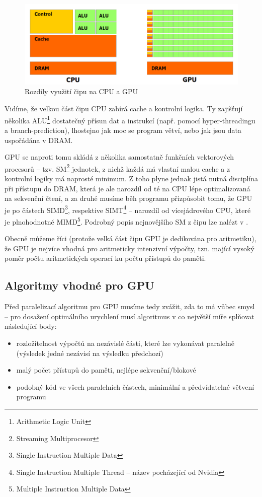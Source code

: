         \begin{figure}[h]\label{cpu vs gpu}
          \includegraphics[width = \textwidth]{src/2Gpu/CPUGPU.png}
          \caption{Rozdíly využití čipu na CPU a GPU}
        \end{figure}

        Vidíme, že velkou část čipu CPU zabírá cache a kontrolní logika. Ty zajišťují několika ALU\footnote{Arithmetic Logic Unit} dostatečný přísun dat a instrukcí (např. pomocí hyper-threadingu a branch-prediction), lhostejno jak moc se program větví, nebo jak jsou data uspořádána v DRAM.

        GPU se naproti tomu skládá z několika samostatně funkčních vektorových procesorů -- tzv. SM\footnote{Streaming Multiprocesor} jednotek, z nichž každá má vlastní malou cache a z kontrolní logiky má naprosté minimum. Z toho plyne jednak jistá nutná disciplína při přístupu do DRAM, která je ale narozdíl od té na CPU lépe optimalizovaná na sekvenční čtení, a za druhé musíme běh programu přizpůsobit tomu, že GPU je po částech SIMD\footnote{Single Instruction Multiple Data}, respektive SIMT\footnote{Single Instruction Multiple Thread -- název pocházející od Nvidia} -- narozdíl od vícejádrového CPU, které je plnohodnotné MIMD\footnote{Multiple Instruction Multiple Data}. Podrobný popis nejnovějšího SM z čipu \FERMI lze nalézt v \cite{Fermi}.

        Obecně můžeme říci (protože velká část čipu GPU je dedikována pro aritmetiku), že GPU je nejvíce vhodná pro aritmeticky intenzivní výpočty, tzn. mající vysoký poměr počtu aritmetických operací ku počtu přístupů do paměti.

    \subsection{Algoritmy vhodné pro GPU}

        Před paralelizací algoritmu pro GPU musíme tedy zvážit, zda to má vůbec smysl -- pro dosažení optimálního urychlení musí algoritmus v co největší míře splňovat následující body:
        \begin{itemize}
          \item rozložitelnost výpočtů na nezávislé části, které lze vykonávat paralelně (výsledek jedné nezávisí na výsledku předchozí)
          \item malý počet přístupů do paměti, nejlépe sekvenční/blokové
          \item podobný kód ve všech paralelních částech, minimální a předvídatelné větvení programu
        \end{itemize}

